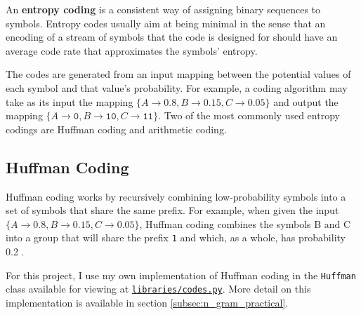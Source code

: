 An \textbf{entropy coding} is a consistent way of assigning binary sequences to symbols. Entropy codes usually aim at being minimal in the sense that an encoding of a stream of symbols that the code is designed for should have an average code rate that approximates the symbols' entropy.

The codes are generated from an input mapping between the potential values of each symbol and that value's probability. For example, a coding algorithm may take as its input the mapping $\{A \rightarrow 0.8, B \rightarrow 0.15, C \rightarrow 0.05\}$ and output the mapping $\{A \rightarrow \texttt{0}, B \rightarrow \texttt{10}, C \rightarrow \texttt{11}\}$. Two of the most commonly used entropy codings are Huffman coding and arithmetic coding.

\subsection{Huffman Coding}

\begin{figure}
    \centering
\end{figure}

Huffman coding works by recursively combining low-probability symbols into a set of symbols that share the same prefix. For example, when given the input $\{A \rightarrow 0.8, B \rightarrow 0.15, C \rightarrow 0.05\}$, Huffman coding combines the symbols B and C into a group that will share the prefix \texttt{1} and which, as a whole, has probability 0.2 .

For this project, I use my own implementation of Huffman coding in the \texttt{Huffman} class available for viewing at \texttt{\href{https://github.com/Guy29/FYP/blob/main/Code/libraries/codes.py}{libraries/codes.py}}. More detail on this implementation is available in section \ref{subsec:n_gram_practical}.

